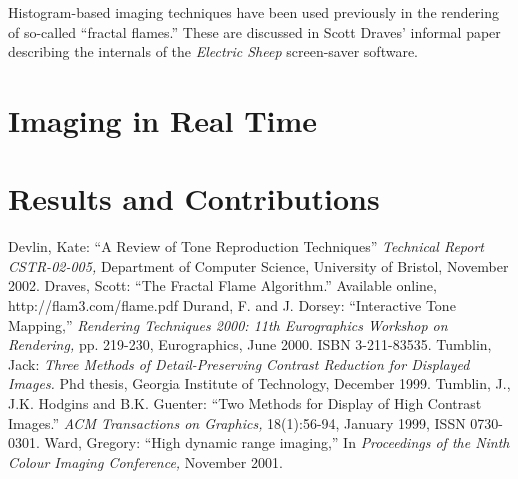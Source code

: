\documentclass[letterpaper, 12pt]{article}
\begin{document}
Histogram-based imaging techniques have been used previously in the rendering of so-called
``fractal flames.''  These are discussed in Scott Draves' informal paper describing the
internals of the \emph{Electric Sheep} screen-saver software\cite{sd}.

\section{Imaging in Real Time}

\section{Results and Contributions}

\begin{thebibliography}{77}
 Devlin, Kate: ``A Review of Tone Reproduction Techniques'' {\it Technical Report CSTR-02-005,} Department of Computer Science, University of Bristol, November 2002.
 Draves, Scott: ``The Fractal Flame Algorithm.'' Available online, http://flam3.com/flame.pdf
 Durand, F. and J. Dorsey: ``Interactive Tone Mapping,'' {\it Rendering Techniques 2000: 11th Eurographics Workshop on Rendering,} pp. 219-230, Eurographics, June 2000. ISBN 3-211-83535.
 Tumblin, Jack: {\it Three Methods of Detail-Preserving Contrast Reduction for Displayed Images.} Phd thesis, Georgia Institute of Technology, December 1999.
 Tumblin, J., J.K. Hodgins and B.K. Guenter: ``Two Methods for Display of High Contrast Images.'' {\it ACM Transactions on Graphics,} 18(1):56-94, January 1999, ISSN 0730-0301.
 Ward, Gregory: ``High dynamic range imaging,'' In {\it Proceedings of the Ninth Colour Imaging Conference,} November 2001.
\end{thebibliography}
\end{document}
